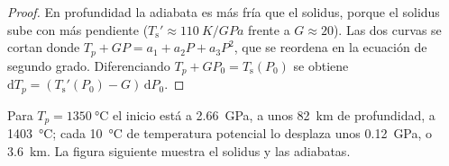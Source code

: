 \begin{proof}
En profundidad la adiabata es más fría que el solidus, porque el solidus sube con más
pendiente ($T_{\mathrm
s}' \approx \qty{110}{K/GPa}$ frente a $G \approx 20$). Las dos curvas se cortan donde
$T_p + GP = a_1 + a_2P + a_3P^2$, que se reordena en la ecuación de segundo grado. Diferenciando
$T_p + GP_0 = T_{\mathrm s}(P_0)$ se obtiene $\mathrm dT_p = (T_{\mathrm s}'(P_0) -
G)\,\mathrm dP_0$.
\end{proof}

Para $T_p = \qty{1350}{\celsius}$ el inicio está a \qty{2.66}{GPa}, a unos
\qty{82}{km} de profundidad, a \qty{1403}{\celsius}; cada \qty{10}{\celsius} de temperatura
potencial lo desplaza unos \qty{0.12}{GPa}, o \qty{3.6}{km}. La figura siguiente
muestra el solidus y las adiabatas.

